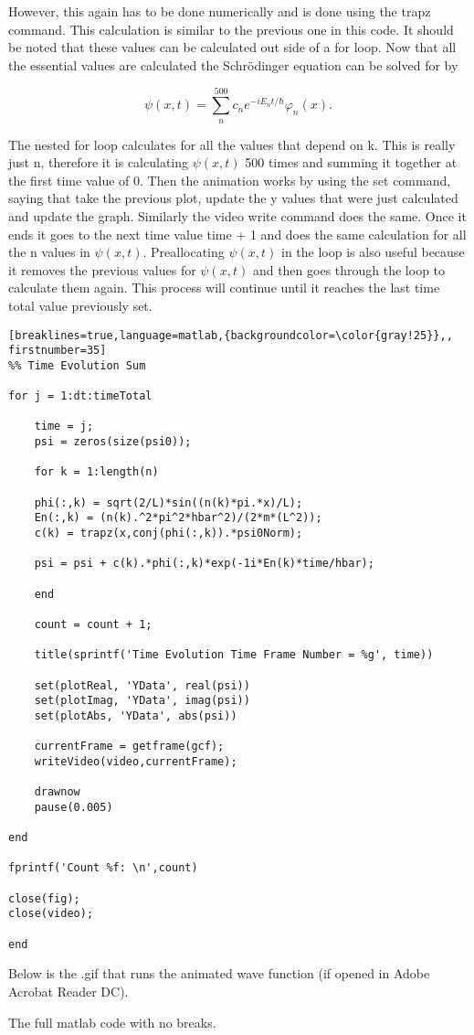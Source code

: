 \documentclass{article}
\begin{document}
However, this again has to be done numerically and is done using the trapz command. This calculation is similar to the previous one in this code. It should be noted that these values can be calculated out side of a for loop. Now that all the essential values are calculated the Schrödinger equation can be solved for by

$$
\psi(x,t) = \sum_{n}^{500} c_{n} e^{-iE_nt/\hbar}\varphi_{n}(x).
$$

The nested for loop calculates for all the values that depend on k. This is really just n, therefore it is calculating $\psi(x,t)$ 500 times and summing it together at the first time value of 0. Then the animation works by using the set command, saying that take the previous plot, update the y values that were just calculated and update the graph. Similarly the video write command does the same. Once it ends it goes to the next time value time + 1 and does the same calculation for all the n values in $\psi(x,t)$. Preallocating $\psi(x,t)$ in the loop is also useful because it removes the previous values for $\psi(x,t)$ and then goes through the loop to calculate them again. This process will continue until it reaches the last time total value previously set. 

\begin{lstlisting}[breaklines=true,language=matlab,{backgroundcolor=\color{gray!25}},, firstnumber=35]
%% Time Evolution Sum

for j = 1:dt:timeTotal
    
    time = j;
    psi = zeros(size(psi0));
    
    for k = 1:length(n)
    
    phi(:,k) = sqrt(2/L)*sin((n(k)*pi.*x)/L);
    En(:,k) = (n(k).^2*pi^2*hbar^2)/(2*m*(L^2));
    c(k) = trapz(x,conj(phi(:,k)).*psi0Norm);
    
    psi = psi + c(k).*phi(:,k)*exp(-1i*En(k)*time/hbar);
    
    end

    count = count + 1;
      
    title(sprintf('Time Evolution Time Frame Number = %g', time))
    
    set(plotReal, 'YData', real(psi))
    set(plotImag, 'YData', imag(psi))
    set(plotAbs, 'YData', abs(psi))
    
    currentFrame = getframe(gcf);
    writeVideo(video,currentFrame); 
    
    drawnow
    pause(0.005)
                
end

fprintf('Count %f: \n',count)

close(fig);
close(video);

end
\end{lstlisting}

\newpage

Below is the .gif that runs the animated wave function (if opened in Adobe Acrobat Reader DC). 

The full matlab code with no breaks.


\end{document}
